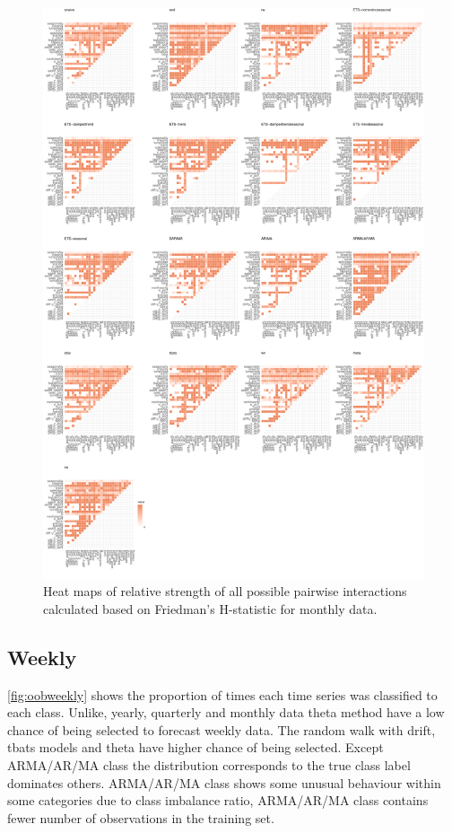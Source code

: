 \documentclass[11pt,a4paper,]{article}
\begin{document}
\begin{figure}
\centering
\includegraphics{figures/friedmanM-1.pdf}
\caption{\label{fig:friedmanM}Heat maps of relative strength of all possible
pairwise interactions calculated based on Friedman's H-statistic for
monthly data.}
\end{figure}

\subsection{Weekly}\label{weekly}

\autoref{fig:oobweekly} shows the proportion of times each time series
was classified to each class. Unlike, yearly, quarterly and monthly data
theta method have a low chance of being selected to forecast weekly
data. The random walk with drift, tbats models and theta have higher
chance of being selected. Except ARMA/AR/MA class the distribution
corresponds to the true class label dominates others. ARMA/AR/MA class
shows some unusual behaviour within some categories due to class
imbalance ratio, ARMA/AR/MA class contains fewer number of observations
in the training set.
\end{document}
